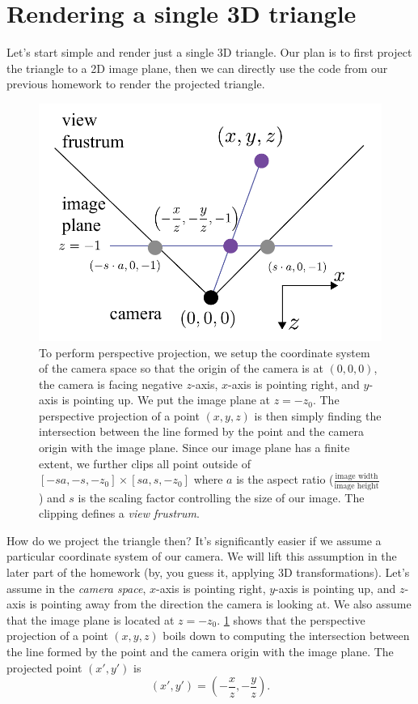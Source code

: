 \section{Rendering a single 3D triangle}
Let's start simple and render just a single 3D triangle. Our plan is to first project the triangle to a 2D image plane, then we can directly use the code from our previous homework to render the projected triangle.

\begin{figure}[h]
    \centering
    \includegraphics[width=0.5\linewidth]{imgs/perspective_transform.pdf}
    \caption{To perform perspective projection, we setup the coordinate system of the camera space so that the origin of the camera is at $(0, 0, 0)$, the camera is facing negative $z$-axis, $x$-axis is pointing right, and $y$-axis is pointing up. We put the image plane at $z=-z_0$. The perspective projection of a point $(x, y, z)$ is then simply finding the intersection between the line formed by the point and the camera origin with the image plane. Since our image plane has a finite extent, we further clips all point outside of $[-sa, -s, -z_0] \times [sa, s, -z_0]$ where $a$ is the aspect ratio ($\frac{\text{image width}}{\text{image height}}$) and $s$ is the scaling factor controlling the size of our image. The clipping defines a \emph{view frustrum}.}
    \label{fig:perspective_transform}
\end{figure}

How do we project the triangle then? It's significantly easier if we assume a particular coordinate system of our camera. We will lift this assumption in the later part of the homework (by, you guess it, applying 3D transformations). Let's assume in the \emph{camera space}, $x$-axis is pointing right, $y$-axis is pointing up, and $z$-axis is pointing away from the direction the camera is looking at. We also assume that the image plane is located at $z=-z_0$. \cref{fig:perspective_transform} shows that the perspective projection of a point $(x, y, z)$ boils down to computing the intersection between the line formed by the point and the camera origin with the image plane. The projected point $(x', y')$ is
\begin{equation}
\left(x', y'\right) = \left(-\frac{x}{z}, -\frac{y}{z}\right).
\label{eq:projection}
\end{equation}


